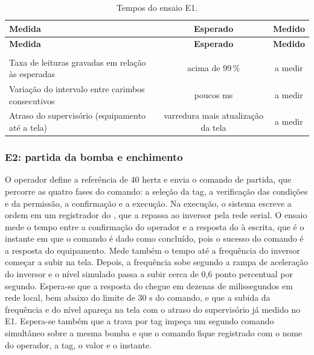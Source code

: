 
{\renewcommand{\arraystretch}{1.3}\small
\begin{xltabular}{\textwidth}{Xcc}
        \caption{Tempos do ensaio E1.}
        \label{tab:cap7_e1}\\
        \hline
        \textbf{Medida} & \textbf{Esperado} & \textbf{Medido} \\
        \hline
        \endfirsthead
        \hline
        \textbf{Medida} & \textbf{Esperado} & \textbf{Medido} \\
        \hline
        \endhead
        \endfoot
         \\
        \endlastfoot
        Taxa de leituras gravadas em relação às esperadas & acima de 99\,\% & a medir \\
        \hline
        Variação do intervalo entre carimbos consecutivos & poucos ms & a medir \\
        \hline
        Atraso do supervisório (equipamento até a tela) & varredura mais atualização da tela & a medir \\
        \hline
\end{xltabular}}


\subsubsection{E2: partida da bomba e enchimento}

\par O operador define a referência de 40 hertz e envia o comando de partida, que percorre as quatro fases do comando: a seleção da tag, a verificação das condições e da permissão, a confirmação e a execução. Na execução, o sistema escreve a ordem em um registrador do , que a repassa ao inversor pela rede serial. O ensaio mede o tempo entre a confirmação do operador e a resposta do  à escrita, que é o instante em que o comando é dado como concluído, pois o sucesso do comando é a resposta do equipamento. Mede também o tempo até a frequência do inversor começar a subir na tela. Depois, a frequência sobe segundo a rampa de aceleração do inversor e o nível simulado passa a subir cerca de 0,6 ponto percentual por segundo. Espera-se que a resposta do  chegue em dezenas de milissegundos em rede local, bem abaixo do limite de 30 s do comando, e que a subida da frequência e do nível apareça na tela com o atraso do supervisório já medido no E1. Espera-se também que a trava por tag impeça um segundo comando simultâneo sobre a mesma bomba e que o comando fique registrado com o nome do operador, a tag, o valor e o instante.

